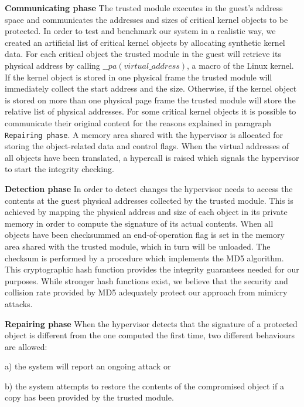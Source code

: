 \textbf{Communicating phase}
The trusted module executes in the guest's address space and communicates the addresses and sizes of critical kernel objects to be protected. 
In order to test and benchmark our system in a realistic way, we created an artificial list of critical kernel objects by allocating synthetic kernel data.
For each critical object the trusted module in the guest will retrieve its physical address by calling $\_\_pa(virtual\_address)$, a macro of the Linux kernel. 
If the kernel object is stored in one physical frame the trusted module will immediately collect the start address and the size. Otherwise, if the kernel object is stored on more than one physical page 
frame the trusted module will store the relative list of physical addresses. 
For some critical kernel objects it is possible to communicate their original content for the reasons explained in paragraph \texttt{Repairing phase}. 
A memory area shared with the hypervisor is allocated for storing the object-related data and control flags. 
When the virtual addresses of all objects have been translated, a hypercall is raised which signals the hypervisor to start the integrity checking.

\textbf{Detection phase}
In order to detect changes the hypervisor needs to access the contents at the guest physical addresses collected by the trusted module. This is achieved by mapping the physical address and size of each object in its private memory in order to compute the signature of its actual contents. When all objects have been checksummed an end-of-operation flag is set in the memory area shared with the trusted module, which in turn will be unloaded. 
The checksum is performed by a procedure which implements the MD5 algorithm\cite{md5rfc}. This cryptographic hash function provides the integrity guarantees needed for our purposes. While stronger hash functions exist, we believe that the security and collision rate provided by MD5 adequately protect our approach from mimicry attacks. 

\textbf{Repairing phase}
When the hypervisor detects that the signature of a protected object is different from the one computed the first time, two different behaviours are allowed: 

a) the system will report an ongoing attack or 

b) the system attempts to restore the contents of the compromised object if a copy has been provided by the trusted module. 

